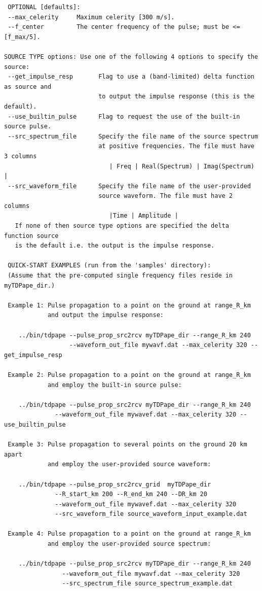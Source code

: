 \begin{verbatim}
 OPTIONAL [defaults]:
 --max_celerity     Maximum celerity [300 m/s].
 --f_center         The center frequency of the pulse; must be <= [f_max/5].

SOURCE TYPE options: Use one of the following 4 options to specify the source:
 --get_impulse_resp       Flag to use a (band-limited) delta function as source and
                          to output the impulse response (this is the default).
 --use_builtin_pulse      Flag to request the use of the built-in source pulse.
 --src_spectrum_file      Specify the file name of the source spectrum
                          at positive frequencies. The file must have 3 columns
                             | Freq | Real(Spectrum) | Imag(Spectrum) |
 --src_waveform_file      Specify the file name of the user-provided 
                          source waveform. The file must have 2 columns
                             |Time | Amplitude |
   If none of then source type options are specified the delta function source
   is the default i.e. the output is the impulse response.

 QUICK-START EXAMPLES (run from the 'samples' directory):
 (Assume that the pre-computed single frequency files reside in myTDPape_dir.) 

 Example 1: Pulse propagation to a point on the ground at range_R_km
            and output the impulse response:

    ../bin/tdpape --pulse_prop_src2rcv myTDPape_dir --range_R_km 240 
                  --waveform_out_file mywavf.dat --max_celerity 320 --get_impulse_resp

 Example 2: Pulse propagation to a point on the ground at range_R_km
            and employ the built-in source pulse:

    ../bin/tdpape --pulse_prop_src2rcv myTDPape_dir --range_R_km 240 
              --waveform_out_file mywavef.dat --max_celerity 320 --use_builtin_pulse

 Example 3: Pulse propagation to several points on the ground 20 km apart
            and employ the user-provided source waveform:

    ../bin/tdpape --pulse_prop_src2rcv_grid  myTDPape_dir  
              --R_start_km 200 --R_end_km 240 --DR_km 20 
              --waveform_out_file mywavef.dat --max_celerity 320 
              --src_waveform_file source_waveform_input_example.dat

 Example 4: Pulse propagation to a point on the ground at range_R_km
            and employ the user-provided source spectrum:

    ../bin/tdpape --pulse_prop_src2rcv myTDPape_dir --range_R_km 240 
                --waveform_out_file mywavf.dat --max_celerity 320 
                --src_spectrum_file source_spectrum_example.dat
\end{verbatim}

